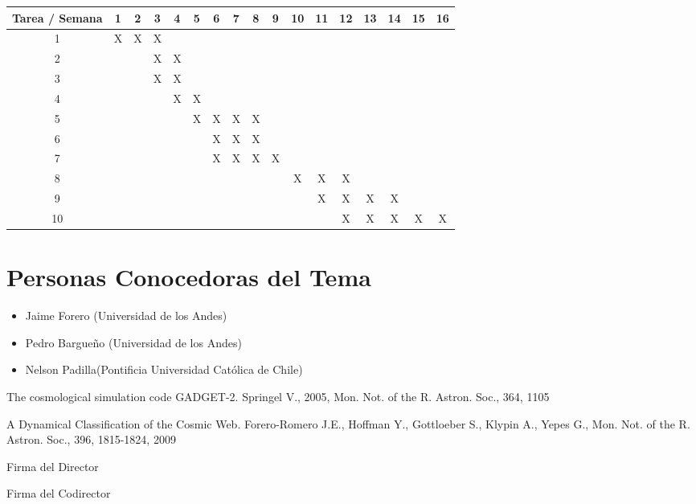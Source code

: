 \documentclass{article}
\begin{document}
\begin{table}[h]

\begin{tabular}{|c||c|c|c|c|c|c|c|c|c|c|c|c|c|c|c|c|}

\hline
Tarea / Semana & 1 & 2 & 3 & 4 & 5 & 6 & 7 & 8 & 9 & 10 & 11 & 12 & 13 & 14 & 15 & 16  \\
\hline\hline
1 & X & X & X &  &   &   &   &   &   &   &   &   &   &   &   &  \\
\hline
2 &   &  & X & X &  &   &   &   &   &   &   &   &   &   &   &  \\
\hline
3 &   &   &  X & X  & & &  &   &   &   &   &   &   &   &   &  \\
\hline
4 &   &   &   &  X & X  &  &  &  &   &   &   &   &   &   &   &  \\
\hline
5 &   &   &   &   & X  & X & X &  X &  &   &   &   &   &   &   &  \\
\hline
6 &   &   &   &   &   & X  & X & X &   &   &   &   &   &   &   &  \\
\hline
7 &   &   &   &   &   & X & X & X & X &  &  &  &  &   &   &  \\
\hline
8 &   &   &   &   &   &   &   &   &   & X & X & X &  &   &   &  \\
\hline
9 &   &   &   &   &   &   &   &   &   &   & X  & X & X & X &  &  \\
\hline
10 &   &   &   &   &   &   &   &   &   &   &   & X & X & X & X & X\\
\hline

\end{tabular}

\end{table}

\section{Personas Conocedoras del Tema}

\begin{itemize}
\item Jaime Forero (Universidad de los Andes)
\item Pedro Bargueño (Universidad de los Andes)
\item Nelson Padilla(Pontificia Universidad Católica de Chile)
\end{itemize}

\begin{thebibliography}{9}

The cosmological simulation code GADGET-2. Springel V., 2005, Mon. Not. of the R. Astron. Soc., 364, 1105   

A Dynamical Classification of the Cosmic Web. Forero-Romero J.E., Hoffman Y., Gottloeber S., Klypin A., Yepes G., Mon. Not. of the R. Astron. Soc., 396, 1815-1824, 2009

\end{thebibliography}

Firma del Director


Firma del Codirector
\end{document}
